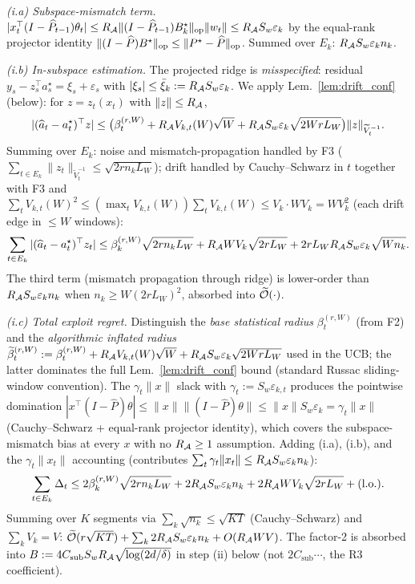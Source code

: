 \emph{(i.a) Subspace-mismatch term.}
$|x_t^\top(I-\widehat P_{t-1})\theta_t|\le R_{\mathcal{A}}\|(I-\widehat P_{t-1})B_k^\star\|_{\mathrm{op}}\|w_t\|
\le R_{\mathcal{A}} S_w\varepsilon_k$ by the equal-rank projector identity
$\|(I-\widehat P)B^\star\|_{\mathrm{op}}\le\|P^\star-\widehat P\|_{\mathrm{op}}$.
Summed over $E_k$: $R_{\mathcal{A}} S_w\varepsilon_k n_k$.

\emph{(i.b) In-subspace estimation.} The projected ridge is
\emph{misspecified}: residual $y_s-z_s^\top a_s^\star = \xi_s+\varepsilon_s$
with $|\xi_s|\le\bar\xi_k:=R_{\mathcal{A}} S_w\varepsilon_k$. We apply
Lem.~\ref{lem:drift_conf} (below): for $z=z_t(x_t)$ with $\|z\|\le R_{\mathcal{A}}$,
\[
|(\widehat a_t-a_t^\star)^\top z|
\le\bigl(\beta_t^{(r,W)}+R_{\mathcal{A}} V_{k,t}(W)\sqrt{W}+R_{\mathcal{A}} S_w\varepsilon_k\sqrt{2WrL_W}\bigr)\|z\|_{\widetilde V_t^{-1}}.
\]
Summing over $E_k$: noise and mismatch-propagation handled by F3
($\sum_{t\in E_k}\|z_t\|_{\widetilde V_t^{-1}}\le\sqrt{2rn_kL_W}$); drift
handled by Cauchy--Schwarz in $t$ together with F3 and
$\sum_t V_{k,t}(W)^2\le(\max_t V_{k,t}(W))\sum_t V_{k,t}(W)\le V_k\cdot WV_k=WV_k^2$
(each drift edge in $\le W$ windows):
\begin{equation}
\sum_{t\in E_k}|(\widehat a_t-a_t^\star)^\top z_t|
\le\beta_k^{(r,W)}\sqrt{2rn_kL_W}+R_{\mathcal{A}} W V_k\sqrt{2rL_W}
+2rL_W R_{\mathcal{A}} S_w\varepsilon_k\sqrt{Wn_k}.
\label{eq:in_subspace_sum}
\end{equation}
The third term (mismatch propagation through ridge) is lower-order
than $R_{\mathcal{A}} S_w\varepsilon_k n_k$ when $n_k\ge W(2rL_W)^2$, absorbed
into $\widetilde{\mathcal{O}}(\cdot)$.

\emph{(i.c) Total exploit regret.}
Distinguish the \emph{base statistical radius} $\beta_t^{(r,W)}$ (from F2)
and the \emph{algorithmic inflated radius}
$\widetilde\beta_t^{(r,W)} := \beta_t^{(r,W)}+R_{\mathcal{A}} V_{k,t}(W)\sqrt{W}+R_{\mathcal{A}} S_w\varepsilon_k\sqrt{2WrL_W}$
used in the UCB; the latter dominates the full
Lem.~\ref{lem:drift_conf} bound (standard Russac sliding-window
convention). The $\gamma_t\|x\|$ slack with
$\gamma_t := S_w\varepsilon_{k,t}$ produces the pointwise domination
$|x^\top(I-\widehat P)\theta|\le\|x\|\|(I-\widehat P)\theta\|\le\|x\|S_w\varepsilon_k=\gamma_t\|x\|$
(Cauchy--Schwarz + equal-rank projector identity), which covers the
subspace-mismatch bias at every $x$ with no $R_{\mathcal{A}}\ge 1$ assumption. Adding (i.a), (i.b), and the $\gamma_t\|x_t\|$
accounting (contributes $\sum_t\gamma_t\|x_t\|\le R_{\mathcal{A}} S_w\varepsilon_k n_k$):
\begin{equation}
\sum_{t\in E_k}\Delta_t
\le 2\beta_k^{(r,W)}\sqrt{2rn_kL_W}+2R_{\mathcal{A}} S_w\varepsilon_k n_k
+2R_{\mathcal{A}} WV_k\sqrt{2rL_W}+(\text{l.o.}).
\label{eq:exploit_sum}
\end{equation}
Summing over $K$ segments via $\sum_k\sqrt{n_k}\le\sqrt{KT}$
(Cauchy--Schwarz) and $\sum_k V_k=V$:
$\widetilde{\mathcal{O}}(r\sqrt{KT})+\sum_k 2R_{\mathcal{A}} S_w\varepsilon_k n_k+O(R_{\mathcal{A}} W V)$. The
factor-2 is absorbed into $B:=4 C_{\mathrm{sub}} S_w R_{\mathcal{A}}\sqrt{\log(2d/\delta)}$
in step (ii) below (not $2C_{\mathrm{sub}}\cdots$, the R3 coefficient).

